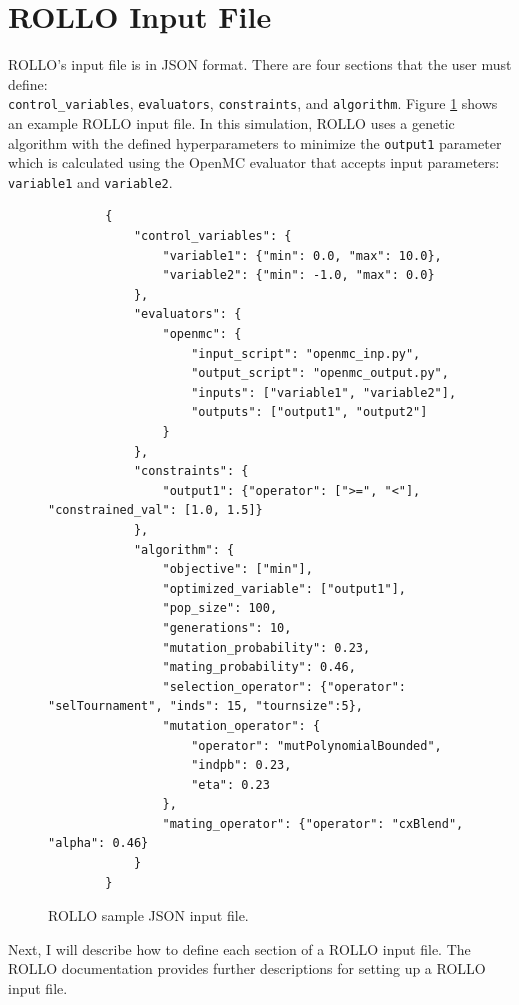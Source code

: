 \section{ROLLO Input File}
\gls{ROLLO}'s input file is in JSON format. 
There are four sections that the user must define: \\ \texttt{control\_variables}, 
\texttt{evaluators}, \texttt{constraints}, and \texttt{algorithm}. 
Figure \ref{fig:rollo-input} shows an example \gls{ROLLO} input file. 
In this simulation, \gls{ROLLO} uses a genetic algorithm with the defined 
hyperparameters to minimize the \texttt{output1} parameter which is 
calculated using the OpenMC evaluator that accepts input parameters: 
\texttt{variable1} and \texttt{variable2}. 
\begin{figure}[]
    \begin{verbatim}
        {
            "control_variables": {
                "variable1": {"min": 0.0, "max": 10.0}, 
                "variable2": {"min": -1.0, "max": 0.0}
            }, 
            "evaluators": {
                "openmc": {
                    "input_script": "openmc_inp.py",
                    "output_script": "openmc_output.py", 
                    "inputs": ["variable1", "variable2"],
                    "outputs": ["output1", "output2"]
                }
            }, 
            "constraints": {
                "output1": {"operator": [">=", "<"], "constrained_val": [1.0, 1.5]}
            }, 
            "algorithm": {
                "objective": ["min"], 
                "optimized_variable": ["output1"], 
                "pop_size": 100, 
                "generations": 10, 
                "mutation_probability": 0.23,
                "mating_probability": 0.46,
                "selection_operator": {"operator": "selTournament", "inds": 15, "tournsize":5},
                "mutation_operator": {
                    "operator": "mutPolynomialBounded",
                    "indpb": 0.23,
                    "eta": 0.23
                },
                "mating_operator": {"operator": "cxBlend", "alpha": 0.46}
            }
        }
    \end{verbatim}
    \caption{\acrfull{ROLLO} sample JSON input file.}
    \label{fig:rollo-input}
\end{figure}

Next, I will describe how to define each section of a \gls{ROLLO} input file. 
The \gls{ROLLO} documentation \cite{chee_documentation_2021} provides further 
descriptions for setting up a \gls{ROLLO} input file.

